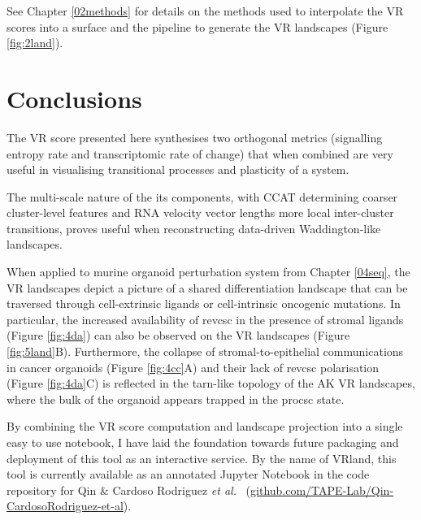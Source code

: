 See Chapter \ref{02methods} for details on the methods used to interpolate the VR scores into a surface and the pipeline to generate the VR landscapes (Figure \ref{fig:2land}).

\newpage
\section{Conclusions}

The VR score presented here synthesises two orthogonal metrics (signalling entropy rate and transcriptomic rate of change) that when combined are very useful in visualising transitional processes and plasticity of a system. 

The multi-scale nature of the its components, with CCAT determining coarser cluster-level features and RNA velocity vector lengths more local inter-cluster transitions, proves useful when reconstructing data-driven Waddington-like landscapes. 

When applied to murine organoid perturbation system from Chapter \ref{04seq}, the VR landscapes depict a picture of a shared differentiation landscape that can be traversed through cell-extrinsic ligands or cell-intrinsic oncogenic mutations. In particular, the increased availability of \acrshort{revcsc} in the presence of stromal ligands (Figure \ref{fig:4da}) can also be observed on the VR landscapes (Figure \ref{fig:5land}B). Furthermore, the collapse of stromal-to-epithelial communications in cancer organoids (Figure \ref{fig:4cc}A) and their lack of \acrshort{revcsc} polarisation (Figure \ref{fig:4da}C) is reflected in the tarn-like topology of the AK VR landscapes, where the bulk of the organoid appears trapped in the \acrshort{procsc} state.

By combining the VR score computation and landscape projection into a single easy to use notebook, I have laid the foundation towards future packaging and deployment of this tool as an interactive service. By the name of VRland, this tool is currently available as an annotated Jupyter Notebook in the code repository for Qin \& Cardoso Rodriguez \emph{et al.}~\cite{cardoso_rodriguez_single-cell_2023} (\href{www.github.com/TAPE-Lab/Qin-CardosoRodriguez-et-al}{github.com/TAPE-Lab/Qin-CardosoRodriguez-et-al}).
